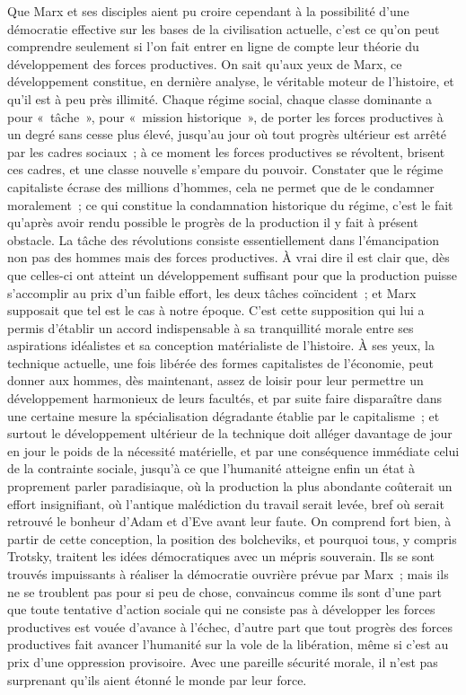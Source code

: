 \documentclass[french,twoside]{book} %
\begin{document}
Que Marx et ses disciples aient pu croire cependant à la possibilité d'une démocratie effective sur les bases de la civilisation actuelle, c'est ce qu'on peut comprendre seulement si l'on fait entrer en ligne de compte leur théorie du développement des forces productives. On sait qu'aux yeux de Marx, ce développement constitue, en dernière analyse, le véritable moteur de l'histoire, et qu'il est à peu près illimité. Chaque régime social, chaque classe dominante a pour « tâche », pour « mission historique », de porter les forces productives à un degré sans cesse plus élevé, jusqu'au jour où tout progrès ultérieur est arrêté par les cadres sociaux ; à ce moment les forces productives se révoltent, brisent ces cadres, et une classe nouvelle s'empare du pouvoir. Constater que le régime capitaliste écrase des millions d'hommes, cela ne permet que de le condamner moralement ; ce qui constitue la condamnation historique du régime, c'est le fait qu'après avoir rendu possible le progrès de la production il y fait à présent obstacle. La tâche des révolutions consiste essentiellement dans l'émancipation non pas des hommes mais des forces productives. À vrai dire il est clair que, dès que celles-ci ont atteint un développement suffisant pour que la production puisse s'accomplir au prix d'un faible effort, les deux tâches coïncident ; et Marx supposait que tel est le cas à notre époque. C'est cette supposition qui lui a permis d'établir un accord indispensable à sa tranquillité morale entre ses aspirations idéalistes et sa conception matérialiste de l'histoire. À ses yeux, la technique actuelle, une fois libérée des formes capitalistes de l'économie, peut donner aux hommes, dès maintenant, assez de loisir pour leur permettre un développement harmonieux de leurs facultés, et par suite faire disparaître dans une certaine mesure la spécialisation dégradante établie par le capitalisme ; et surtout le développement ultérieur de la technique doit alléger davantage de jour en jour le poids de la nécessité matérielle, et par une conséquence immédiate celui de la contrainte sociale, jusqu'à ce que l'humanité atteigne enfin un état à proprement parler paradisiaque, où la production la plus abondante coûterait un effort insignifiant, où l'antique malédiction du travail serait levée, bref où serait retrouvé le bonheur d'Adam et d'Eve avant leur faute. On comprend fort bien, à partir de cette conception, la position des bolcheviks, et pourquoi tous, y compris Trotsky, traitent les idées démocratiques avec un mépris souverain. Ils se sont trouvés impuissants à réaliser la démocratie ouvrière prévue par Marx ; mais ils ne se troublent pas pour si peu de chose, convaincus comme ils sont d'une part que toute tentative d'action sociale qui ne consiste pas à développer les forces productives est vouée d'avance à l'échec, d'autre part que tout progrès des forces productives fait avancer l'humanité sur la vole de la libération, même si c'est au prix d'une oppression provisoire. Avec une pareille sécurité morale, il n'est pas surprenant qu'ils aient étonné le monde par leur force.\par
\end{document}

